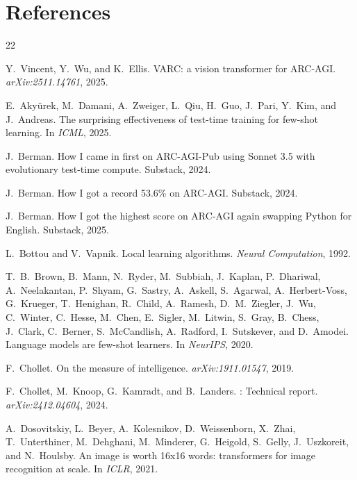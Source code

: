 \documentclass{article}
\begin{document}
\section*{References}

{\small
\begin{thebibliography}{22}

Y.~Vincent, Y.~Wu, and K.~Ellis.
\newblock VARC: a vision transformer for {ARC-AGI}.
\newblock \textit{arXiv:2511.14761}, 2025.

E.~Aky{\"u}rek, M.~Damani, A.~Zweiger, L.~Qiu, H.~Guo, J.~Pari, Y.~Kim, and J.~Andreas.
\newblock The surprising effectiveness of test-time training for few-shot learning.
\newblock In \textit{ICML}, 2025.

J.~Berman.
\newblock How I came in first on {ARC-AGI-Pub} using Sonnet 3.5 with evolutionary test-time compute.
\newblock Substack, 2024.

J.~Berman.
\newblock How I got a record 53.6\% on {ARC-AGI}.
\newblock Substack, 2024.

J.~Berman.
\newblock How I got the highest score on {ARC-AGI} again swapping Python for English.
\newblock Substack, 2025.

L.~Bottou and V.~Vapnik.
\newblock Local learning algorithms.
\newblock \textit{Neural Computation}, 1992.

T.~B.~Brown, B.~Mann, N.~Ryder, M.~Subbiah, J.~Kaplan, P.~Dhariwal, A.~Neelakantan, P.~Shyam, G.~Sastry, A.~Askell, S.~Agarwal, A.~Herbert-Voss, G.~Krueger, T.~Henighan, R.~Child, A.~Ramesh, D.~M.~Ziegler, J.~Wu, C.~Winter, C.~Hesse, M.~Chen, E.~Sigler, M.~Litwin, S.~Gray, B.~Chess, J.~Clark, C.~Berner, S.~McCandlish, A.~Radford, I.~Sutskever, and D.~Amodei.
\newblock Language models are few-shot learners.
\newblock In \textit{NeurIPS}, 2020.

F.~Chollet.
\newblock On the measure of intelligence.
\newblock \textit{arXiv:1911.01547}, 2019.

F.~Chollet, M.~Knoop, G.~Kamradt, and B.~Landers.
: Technical report.
\newblock \textit{arXiv:2412.04604}, 2024.

A.~Dosovitskiy, L.~Beyer, A.~Kolesnikov, D.~Weissenborn, X.~Zhai, T.~Unterthiner, M.~Dehghani, M.~Minderer, G.~Heigold, S.~Gelly, J.~Uszkoreit, and N.~Houlsby.
\newblock An image is worth 16x16 words: transformers for image recognition at scale.
\newblock In \textit{ICLR}, 2021.


\end{thebibliography}}
\end{document}
